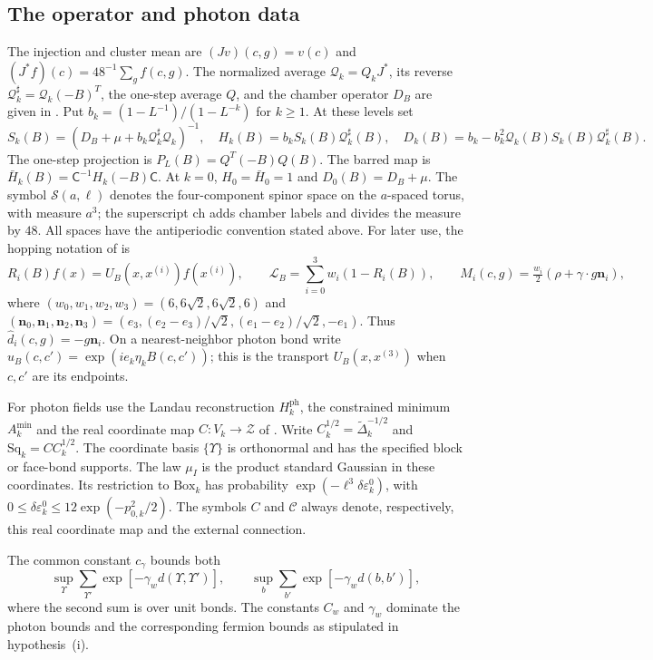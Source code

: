 \documentclass[11pt,letterpaper,reqno]{amsart}
\newcommand{\Sspace}{\mathcal S}
\begin{document}
\subsection{The operator and photon data}

The injection and cluster mean are
$(Jv)(c,g)=v(c)$ and $(J^*f)(c)=48^{-1}\sum_gf(c,g)$.
The normalized average $\mathcal Q_k=Q_kJ^*$, its reverse
$\mathcal Q_k^\sharp=\mathcal Q_k(-B)^T$, the one-step average
$Q$, and the chamber operator $D_B$ are given in
\cite[\S1]{FermionBlockManuscript}. Put $b_k=(1-L^{-1})/(1-L^{-k})$ for $k\ge1$. At these levels set
\[
 S_k(B)=(D_B+\mu+b_k\mathcal Q_k^\sharp\mathcal Q_k)^{-1},\quad
 H_k(B)=b_kS_k(B)\mathcal Q_k^\sharp(B),\quad
 D_k(B)=b_k-b_k^2\mathcal Q_k(B)S_k(B)\mathcal Q_k^\sharp(B).
\]
The one-step projection is $P_L(B)=Q^T(-B)Q(B)$. The barred map is $\bar H_k(B)=\mathsf C^{-1}H_k(-B)\mathsf C$.
At $k=0$, $H_0=\bar H_0=1$ and $D_0(B)=D_B+\mu$.
The symbol $\Sspace(a,\ell)$ denotes the four-component spinor
space on the $a$-spaced torus, with measure $a^3$; the superscript
$\mathrm{ch}$ adds chamber labels and divides the measure by $48$.
All spaces have the antiperiodic convention stated above.
For later use, the hopping notation of \cite[\S2.1]{FermionBlockManuscript} is
\[
 R_i(B)f(x)=U_B(x,x^{(i)})f(x^{(i)}),\qquad
 \mathcal L_B=\sum_{i=0}^3w_i(1-R_i(B)),\qquad
 M_i(c,g)=\tfrac{w_i}{2}(\rho+\gamma\cdot g\mathbf n_i),
\]
where $(w_0,w_1,w_2,w_3)=(6,6\sqrt2,6\sqrt2,6)$ and
$(\mathbf n_0,\mathbf n_1,\mathbf n_2,\mathbf n_3)=(e_3,(e_2-e_3)/\sqrt2,(e_1-e_2)/\sqrt2,-e_1)$.
Thus $\widehat d_i(c,g)=-g\mathbf n_i$. On a nearest-neighbor photon bond
write $u_B(c,c')=\exp(ie_k\eta_kB(c,c'))$; this is the transport
$U_B(x,x^{(3)})$ when $c,c'$ are its endpoints.

For photon fields use the Landau reconstruction $H_k^{\mathrm{ph}}$,
the constrained minimum $A_k^{\min}$ and the real coordinate map
$C:V_k\to\mathcal Z$ of
\cite[Theorem~A]{MaxwellBlockManuscript}. Write
$C_k^{1/2}=\widetilde\Delta_k^{-1/2}$ and
$\mathrm{Sq}_k=CC_k^{1/2}$. The coordinate basis $\{\Upsilon\}$ is
orthonormal and has the specified block or face-bond supports.
The law $\mu_I$ is the product standard Gaussian in these coordinates.
Its restriction to $\mathrm{Box}_k$ has probability
$\exp(-\ell^3\delta\varepsilon_k^0)$, with
$0\le\delta\varepsilon_k^0\le12\exp(-p_{0,k}^2/2)$.
The symbols $C$ and $\mathscr C$ always denote, respectively,
this real coordinate map and the external connection.

The common constant $c_\gamma$ bounds both
\[
 \sup_\Upsilon\sum_{\Upsilon'}\exp[-\gamma_wd(\Upsilon,\Upsilon')],
 \qquad \sup_b\sum_{b'}\exp[-\gamma_wd(b,b')],
\]
where the second sum is over unit bonds. The constants $C_w$ and
$\gamma_w$ dominate the photon bounds and the corresponding
fermion bounds as stipulated in hypothesis~(i).
\end{document}
